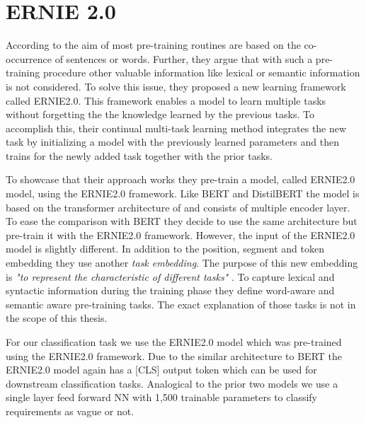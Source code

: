 \section{ERNIE 2.0}
\label{chp:approach:sec:ernie2.0}

According to \textcite{Sun:2019a} the aim of most pre-training routines are based on the co-occurrence of sentences or words.
Further, they argue that with such a pre-training procedure other valuable information like lexical or semantic information is not considered.
To solve this issue, they proposed a new learning framework called \ac{ERNIE2.0}.
This framework enables a model to learn multiple tasks without forgetting the the knowledge learned by the previous tasks.
To accomplish this, their continual multi-task learning method integrates the new task by initializing a model with the previously learned parameters and then trains for the newly added task together with the prior tasks.

To showcase that their approach works they pre-train a model, called \ac{ERNIE2.0} model, using the \ac{ERNIE2.0} framework.
Like \ac{BERT} and \ac{DistilBERT} the model is based on the transformer architecture of \textcite{Vaswani:2017} and consists of multiple encoder layer.
To ease the comparison with \ac{BERT} they decide to use the same architecture but pre-train it with the \ac{ERNIE2.0} framework.
However, the input of the \ac{ERNIE2.0} model is slightly different.
In addition to the position, segment and token embedding they use another \textit{task embedding}.
The purpose of this new embedding is \textit{"to represent the characteristic of different tasks"} \parencite{Sun:2019a}.
To capture lexical and syntactic information during the training phase they define word-aware and semantic aware pre-training tasks.
The exact explanation of those tasks is not in the scope of this thesis. \parencite{Sun:2019a}

For our classification task we use the \ac{ERNIE2.0} model which was pre-trained using the \ac{ERNIE2.0} framework.
Due to the similar architecture to \ac{BERT} the \ac{ERNIE2.0} model again has a [CLS] output token which can be used for downstream classification tasks.
Analogical to the prior two models we use a single layer feed forward \ac{NN} with 1,500 trainable parameters to classify requirements as vague or not.
